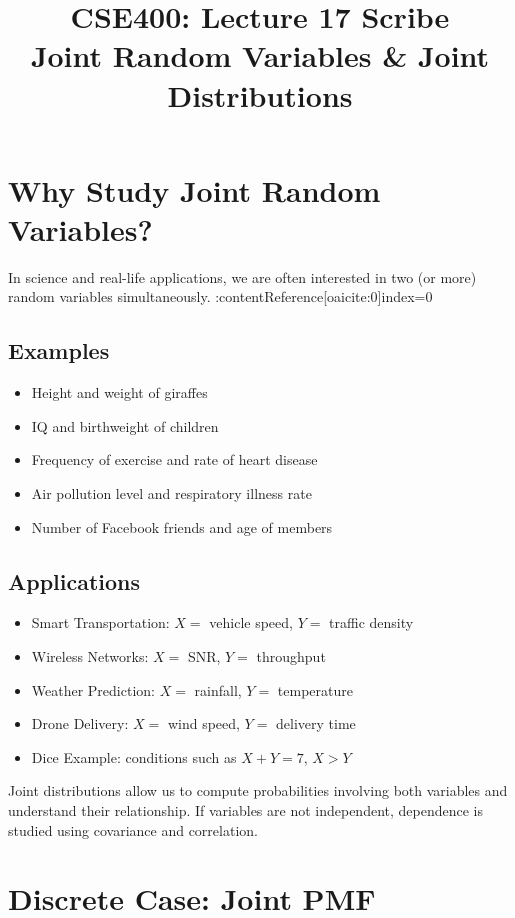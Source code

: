 \documentclass[12pt]{article}
\title{CSE400: Lecture 17 Scribe\\
Joint Random Variables \& Joint Distributions}
\author{}
\date{}
\begin{document}
\maketitle

\section{Why Study Joint Random Variables?}

In science and real-life applications, we are often interested in two (or more) random variables simultaneously.  :contentReference[oaicite:0]{index=0}

\subsection*{Examples}
\begin{itemize}
    \item Height and weight of giraffes
    \item IQ and birthweight of children
    \item Frequency of exercise and rate of heart disease
    \item Air pollution level and respiratory illness rate
    \item Number of Facebook friends and age of members
\end{itemize}

\subsection*{Applications}
\begin{itemize}
    \item Smart Transportation: $X=$ vehicle speed, $Y=$ traffic density
    \item Wireless Networks: $X=$ SNR, $Y=$ throughput
    \item Weather Prediction: $X=$ rainfall, $Y=$ temperature
    \item Drone Delivery: $X=$ wind speed, $Y=$ delivery time
    \item Dice Example: conditions such as $X+Y=7$, $X>Y$
\end{itemize}

Joint distributions allow us to compute probabilities involving both variables and understand their relationship. If variables are not independent, dependence is studied using covariance and correlation.

\section{Discrete Case: Joint PMF}
\end{document}
